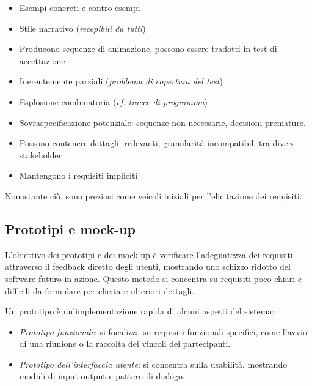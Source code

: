 \begin{tcolorbox}[colback=green!5!white,colframe=green!75!black, title=Pro degli
    scenari]
    \begin{itemize}
        \item Esempi concreti e contro-esempi
        \item Stile narrativo (\textit{recepibili da tutti})
        \item Producono sequenze di animazione, possono essere tradotti in test di accettazione
    \end{itemize}
\end{tcolorbox}

\begin{tcolorbox}[colback=red!5!white,colframe=red!75!black, title=Contro degli
    scenari]
    \begin{itemize}
        \item Inerentemente parziali (\textit{problema di copertura del test})
        \item Esplosione combinatoria (\textit{cf. tracce di programma})
        \item Sovraspecificazione potenziale: sequenze non necessarie, decisioni 
        premature.
        \item Possono contenere dettagli irrilevanti, granularità incompatibili
        tra diversi stakeholder
        \item Mantengono i requisiti impliciti
    \end{itemize}
\end{tcolorbox}

Nonostante ciò, sono preziosi come veicoli iniziali per l'elicitazione dei
requisiti.

\subsection{Prototipi e mock-up}

L'obiettivo dei prototipi e dei mock-up è verificare l'adeguatezza dei requisiti
attraverso il feedback diretto degli utenti, mostrando uno schizzo ridotto del
software futuro in azione. Questo metodo si concentra su requisiti poco chiari
e difficili da formulare per elicitare ulteriori dettagli.

Un prototipo è un'implementazione rapida di alcuni aspetti del sistema:
\begin{itemize}
    \item \textit{Prototipo funzionale}: si focalizza su requisiti funzionali
    specifici, come l'avvio di una riunione o la raccolta dei vincoli dei
    partecipanti.
    \item \textit{Prototipo dell'interfaccia utente}: si concentra sulla
    usabilità, mostrando moduli di input-output e pattern di dialogo.
\end{itemize}

